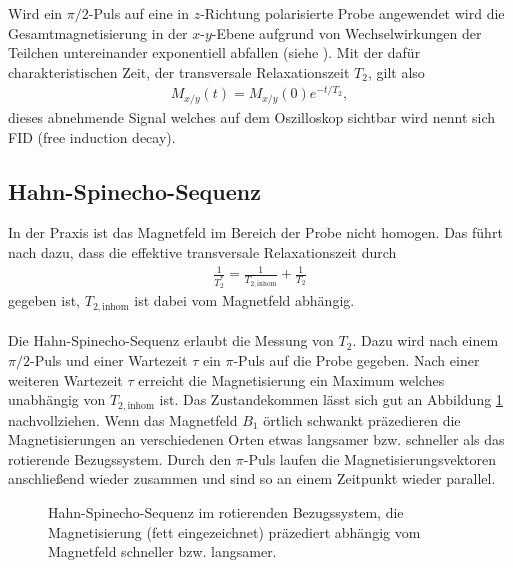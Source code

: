 Wird ein $\pi/2$-Puls auf eine in $z$-Richtung polarisierte Probe angewendet wird die Gesamtmagnetisierung in der $x$-$y$-Ebene aufgrund von Wechselwirkungen der Teilchen untereinander exponentiell abfallen (siehe \cite{manual}). Mit der dafür charakteristischen Zeit, der transversale Relaxationszeit $T_2$, gilt also
\begin{align}
  M_{x/y}(t)=M_{x/y}(0) e^{-t/T_2},
\end{align}
dieses abnehmende Signal welches auf dem Oszilloskop sichtbar wird nennt sich FID (free induction decay).

\subsection{Hahn-Spinecho-Sequenz}
In der Praxis ist das Magnetfeld im Bereich der Probe nicht homogen. Das führt nach \cite{wikinmr} dazu, dass die effektive transversale Relaxationszeit durch
\begin{align*}
  \frac{1}{T_2^*}=\frac{1}{T_{2,\mathrm{inhom}}}+\frac{1}{T_2}
\end{align*}
gegeben ist, $T_{2,\mathrm{inhom}}$ ist dabei vom Magnetfeld abhängig. \\ \\
Die Hahn-Spinecho-Sequenz erlaubt die Messung von $T_2$. Dazu wird nach einem $\pi/2$-Puls und einer Wartezeit $\tau$ ein $\pi$-Puls auf die Probe gegeben. Nach einer weiteren Wartezeit $\tau$ erreicht die Magnetisierung ein Maximum welches unabhängig von $T_{2,\mathrm{inhom}}$ ist. Das Zustandekommen lässt sich gut an Abbildung \ref{hahn} nachvollziehen. Wenn das Magnetfeld $B_1$ örtlich schwankt präzedieren die Magnetisierungen an verschiedenen Orten etwas langsamer bzw. schneller als das rotierende Bezugssystem. Durch den $\pi$-Puls laufen die Magnetisierungsvektoren anschließend wieder zusammen und sind so an einem Zeitpunkt wieder parallel. 

\begin{figure}[h]
  \centering
  \caption{Hahn-Spinecho-Sequenz im rotierenden Bezugssystem, die Magnetisierung (fett eingezeichnet) präzediert abhängig vom Magnetfeld schneller bzw. langsamer.}
  \label{hahn}
\end{figure}

